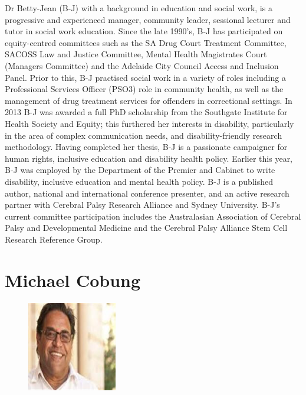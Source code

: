 \documentclass[twoside,12pt,a4paper,notitlepage]{memoir}
\begin{document}
Dr Betty-Jean (B-J) with a background in education and social work, is a progressive and experienced manager, community leader, sessional lecturer and tutor in social work education.  Since the late 1990’s, B-J has participated on equity-centred committees such as the SA Drug Court Treatment Committee, SACOSS Law and Justice Committee, Mental Health Magistrates Court (Managers Committee) and the Adelaide City Council Access and Inclusion Panel.  Prior to this, B-J practised social work in a variety of roles including a Professional Services Officer (PSO3) role in community health, as well as the management of drug treatment services for offenders in correctional settings. In 2013 B-J was awarded a full PhD scholarship from the Southgate Institute for Health Society and Equity; this furthered her interests in disability, particularly in the area of complex communication needs, and disability-friendly research methodology. Having completed her thesis, B-J is a passionate campaigner for human rights, inclusive education and disability health policy. Earlier this year, B-J was employed by the Department of the Premier and Cabinet to write disability, inclusive education and mental health policy.  B-J is a published author, national and international conference presenter, and an active research partner with Cerebral Palsy Research Alliance and Sydney University.  B-J’s current committee participation includes the Australasian Association of Cerebral Palsy and Developmental Medicine and the Cerebral Palsy Alliance Stem Cell Research Reference Group.
\vfill


\clearpage{}
\vspace*{2cm}
\section*{Michael Cobung}

\begin{figure}
\centering
\includegraphics[width=0.35\textwidth]{michael_colbung.jpeg}
\end{figure}
\end{document}
